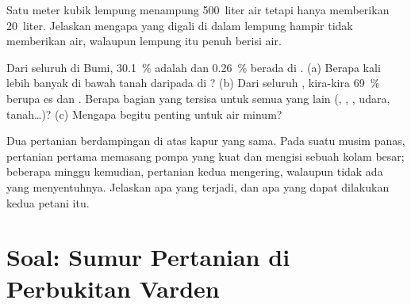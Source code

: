 \begin{exercise}[$\star\star$]\label{exo:g6:water-underground:10}
Satu meter kubik lempung menampung 500~liter air tetapi hanya memberikan
20~liter. Jelaskan mengapa  yang digali di dalam lempung hampir tidak
memberikan air, walaupun lempung itu penuh berisi air.
\end{exercise}

\begin{exercise}[$\star\star\star$]\label{exo:g6:water-underground:11}
Dari seluruh  di Bumi, 30.1~\% adalah  dan 0.26~\% berada
di . (a) Berapa kali lebih banyak  di bawah tanah daripada di
? (b) Dari seluruh , kira-kira 69~\% berupa es dan .
Berapa bagian yang tersisa untuk semua yang lain (, , ,
udara, tanah\ldots)? (c) Mengapa  begitu penting untuk air minum?
\end{exercise}

\begin{exercise}[$\star\star\star$]\label{exo:g6:water-underground:12}
Dua pertanian berdampingan di atas kapur yang sama. Pada suatu musim panas,
pertanian pertama memasang pompa yang kuat dan mengisi sebuah kolam besar;
beberapa minggu kemudian,  pertanian kedua mengering, walaupun tidak
ada yang menyentuhnya. Jelaskan apa yang terjadi, dan apa yang dapat
dilakukan kedua petani itu.
\end{exercise}

\section{Soal: Sumur Pertanian di Perbukitan Varden}

